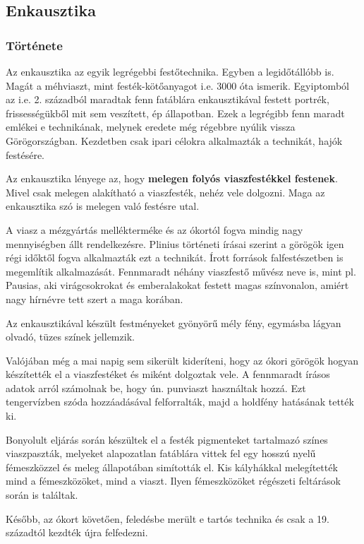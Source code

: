 \subsection*{Enkausztika}

\subsubsection{Története}
Az enkausztika az egyik legrégebbi festőtechnika. Egyben a legidőtállóbb is.
Magát a méhviaszt, mint festék-kötőanyagot i.e. 3000 óta ismerik.
Egyiptomból az i.e. 2. századból maradtak fenn fatáblára enkausztikával festett portrék, frissességükből mit sem veszített, ép állapotban. Ezek a legrégibb fenn maradt emlékei e technikának, melynek eredete még régebbre nyúlik vissza Görögországban. Kezdetben csak ipari célokra alkalmazták a technikát, hajók festésére.

Az enkausztika lényege az, hogy \textbf{melegen folyós viaszfestékkel festenek}.
Mivel csak melegen alakítható a viaszfesték, nehéz vele dolgozni. Maga az enkausztika szó is melegen való festésre utal.

A viasz a mézgyártás mellékterméke és az ókortól fogva mindig nagy mennyiségben állt rendelkezésre. Plinius történeti írásai szerint a görögök igen régi időktől fogva alkalmazták ezt a technikát. Írott források falfestészetben is megemlítik alkalmazását. Fennmaradt néhány viaszfestő művész neve is, mint pl. Pausias, aki virágcsokrokat és emberalakokat festett magas színvonalon, amiért nagy hírnévre tett szert a maga korában.

Az enkausztikával készült festményeket gyönyörű mély fény, egymásba lágyan olvadó, tüzes színek jellemzik.

Valójában még a mai napig sem sikerült kideríteni, hogy az ókori görögök hogyan készítették el a viaszfestéket és miként dolgoztak vele. A fennmaradt írásos adatok arról számolnak be, hogy ún. punviaszt használtak hozzá. Ezt tengervízben szóda hozzáadásával felforralták, majd a holdfény hatásának tették ki.

Bonyolult eljárás során készültek el a festék pigmenteket tartalmazó színes viaszpaszták, melyeket alapozatlan fatáblára vittek fel egy hosszú nyelű fémeszközzel és meleg állapotában simították el. Kis kályhákkal melegítették mind a fémeszközöket, mind a viaszt. Ilyen fémeszközöket régészeti feltárások során is találtak.

Később, az ókort követően, feledésbe merült e tartós technika és csak a 19. századtól kezdték újra felfedezni.

